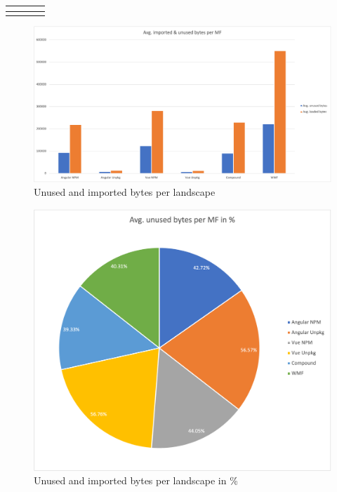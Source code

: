 \begin{longtable}[c]{*{4}{p{\mycolwidthtwo}}}
	&  					
	&     
	&  \\ \midrule
	
	&  						   
	&    
	&   \\ \midrule
\end{longtable}

\begin{figure}[!h]
	\centering
	\includegraphics[width=1\textwidth]{Figures/avg_unsed_imported_1.png}
	\caption{Unused and imported bytes per landscape}
	\label{fig:unsed_imported_1}
\end{figure}

\begin{figure}[!h]
	\centering
	\includegraphics[width=1\textwidth]{Figures/avg_unsed_imported_2.png}
	\caption{Unused and imported bytes per landscape in \%}
	\label{fig:unsed_imported_2}
\end{figure}
\newpage

